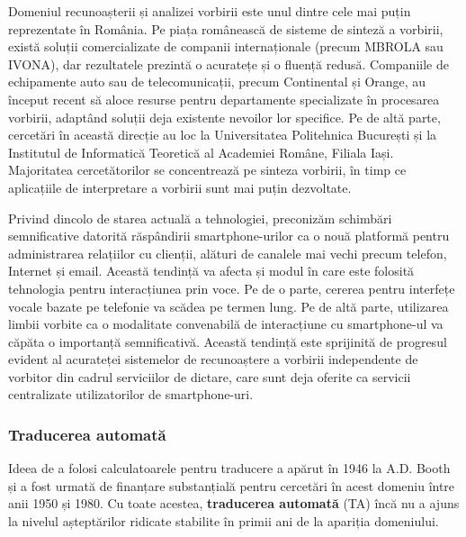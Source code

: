 \begin{multicols}{2}
Domeniul recunoașterii și analizei vorbirii este unul dintre cele mai puțin reprezentate în România. Pe piața românească de sisteme de sinteză a vorbirii, există soluții comercializate de companii internaționale (precum MBROLA sau IVONA), dar rezultatele prezintă o acuratețe și o fluență redusă. Companiile de echipamente auto sau de telecomunicații, precum Continental și Orange, au început recent să aloce resurse pentru departamente specializate în procesarea vorbirii, adaptând soluții deja existente nevoilor lor specifice. Pe de altă parte, cercetări în această direcție au loc la Universitatea Politehnica București și la Institutul de Informatică Teoretică al Academiei Române, Filiala Iași. Majoritatea cercetătorilor se concentrează pe sinteza vorbirii, în timp ce aplicațiile de interpretare a vorbirii sunt mai puțin dezvoltate.

Privind dincolo de starea actuală a tehnologiei, preconizăm schimbări semnificative datorită răspândirii smartphone-urilor ca o nouă platformă pentru administrarea relațiilor cu clienții, alături de canalele mai vechi precum telefon, Internet și email. Această tendință va afecta și modul în care este folosită tehnologia pentru interacțiunea prin voce. Pe de o parte, cererea pentru interfețe vocale bazate pe telefonie va scădea pe termen lung. Pe de altă parte, utilizarea limbii vorbite ca o modalitate convenabilă de interacțiune cu smartphone-ul va căpăta o importanță semnificativă. Această tendință este sprijinită de progresul evident al acurateței sistemelor de recunoaștere a vorbirii independente de vorbitor din cadrul serviciilor de dictare, care sunt deja oferite ca servicii centralizate utilizatorilor de smartphone-uri.

\subsubsection{Traducerea automată}

Ideea de a folosi calculatoarele pentru traducere a apărut în 1946 la A.D. Booth și a fost urmată de finanțare substanțială pentru cercetări în acest domeniu între anii 1950 și 1980. Cu toate acestea, \textbf{traducerea automată} (TA) încă nu a ajuns la nivelul așteptărilor ridicate stabilite în primii ani de la apariția domeniului.



\end{multicols}
